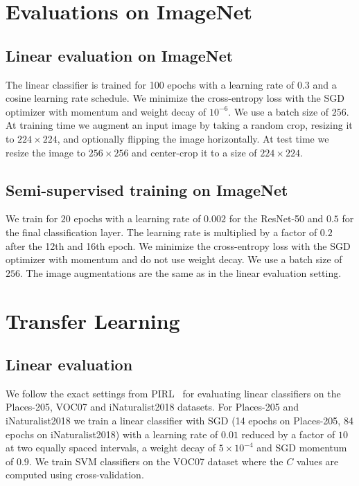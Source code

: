 \section{Evaluations on ImageNet}

\subsection{Linear evaluation on ImageNet}
\label{sec:linear_evaluation}
The linear classifier is trained for 100 epochs with a learning rate of $0.3$ and a cosine learning rate schedule. We minimize the cross-entropy loss with the SGD optimizer with momentum and weight decay of $10^{-6}$. We use a batch size of $256$. At training time we augment an input image by taking a random crop, resizing it to $224 \times 224$, and optionally flipping the image horizontally. At test time we resize the image to $256 \times 256$ and center-crop it to a size of $224 \times 224$.

\subsection{Semi-supervised training on ImageNet}
\label{sec:semisupervised_evaluation}
We train for $20$ epochs with a learning rate of $0.002$ for the ResNet-50 and $0.5$ for the final classification layer. The learning rate is multiplied by a factor of $0.2$ after the 12th and 16th epoch. We minimize the cross-entropy loss with the SGD optimizer with momentum and do not use weight decay. We use a batch size of $256$. The image augmentations are the same as in the linear evaluation setting.

\section{Transfer Learning}

\subsection{Linear evaluation} We follow the exact settings from PIRL~\cite{misra2019self} for evaluating linear classifiers on the Places-205, VOC07 and iNaturalist2018 datasets. For Places-205 and iNaturalist2018 we train a linear classifier with SGD (14 epochs on Places-205, 84 epochs on iNaturalist2018) with a learning rate of $0.01$ reduced by a factor of $10$ at two equally spaced intervals, a weight decay of $5\times10^{-4}$ and SGD momentum of $0.9$. We train SVM classifiers on the VOC07 dataset where the $C$ values are computed using cross-validation.

